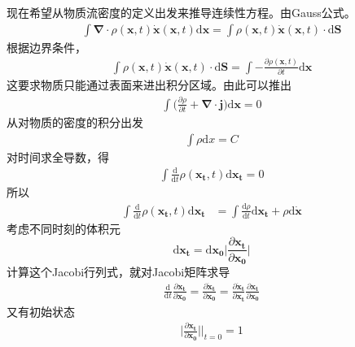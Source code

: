 \documentclass[12pt]{article}
\begin{document}
    现在希望从物质流密度的定义出发来推导连续性方程。由Gauss公式。
    \begin{equation}\begin{aligned}
        \int \bm{\nabla} \cdot \rho(\bm{x},t) \bm{\dot{x}}(\bm{x},t) \mathrm{d}\bm{x} = \int \rho(\bm{x},t) \bm{\dot{x}}(\bm{x},t) \cdot \mathrm{d}\bm{S}
    \end{aligned}\end{equation}
    根据边界条件，
    \begin{equation}\begin{aligned}
        \int \rho(\bm{x},t) \bm{\dot{x}}(\bm{x},t) \cdot \mathrm{d}\bm{S} = \int -\frac {\partial \rho(\bm{x},t)}{\partial t} \mathrm{d}\bm{x}
    \end{aligned}\end{equation}
    这要求物质只能通过表面来进出积分区域。由此可以推出
    \begin{equation}\begin{aligned}
        \int \bigg(\frac {\partial \rho}{\partial t} + \bm{\nabla \cdot j}\bigg) \mathrm{d}\bm{x} = 0 
    \end{aligned}\end{equation}
    从对物质的密度的积分出发
    \begin{equation}\begin{aligned}
        \int \rho \mathrm{d}x = C
    \end{aligned}\end{equation}
    对时间求全导数，得
    \begin{equation}\begin{aligned}
        \int \frac {\mathrm{d}}{\mathrm{d}t}\rho(\bm{x_t},t)\mathrm{d}\bm{x_t} = 0
    \end{aligned}\end{equation}
    所以
    \begin{equation}\begin{aligned}
    \int \frac {\mathrm{d}}{\mathrm{d}t}\rho(\bm{x_t},t)\mathrm{d}\bm{x_t} &= \int \frac {\mathrm{d}\rho}{\mathrm{d}t}\mathrm{d}\bm{x_t} + \rho \mathrm{d}\bm{\dot{x}}
    \end{aligned}\end{equation}
    考虑不同时刻的体积元
    \begin{equation}
        \mathrm{d}\bm{x_t} = \mathrm{d}\bm{x_0} \bigg|\frac {\partial \bm{x_t}}{\partial \bm{x_0}}\bigg|
    \end{equation}
    计算这个Jacobi行列式，就对Jacobi矩阵求导
    \begin{equation}\begin{aligned}
        \frac {\mathrm{d}}{\mathrm{d}t} \frac {\partial \bm{x_t}}{\partial \bm{x_0}} = \frac {\partial \bm{\dot{x}_t}}{\partial \bm{x_0}} = \frac {\partial \bm{\dot{x}_t}}{\partial \bm{x_t}} \frac {\partial \bm{x_t}}{\partial \bm{x_0}}
    \end{aligned}\end{equation}
    又有初始状态
    \begin{equation}\begin{aligned}
        \bigg|\frac {\partial \bm{x_t}}{\partial \bm{x_0}} \bigg|\Bigg|_{t=0} = 1
    \end{aligned}\end{equation}
\end{document}
